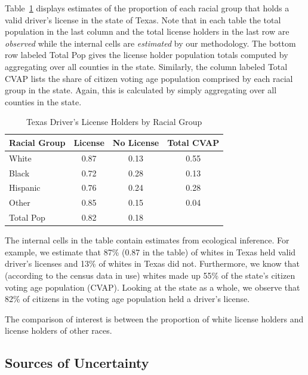 \documentclass[12pt]{article}
\begin{document}
Table~\ref{cvap_f3_ex} displays estimates of the proportion of
each racial group that holds a valid driver's license in the state of Texas. Note that in each
table the total population in the last column and the total license holders in
the last row are {\it observed} while the internal cells are {\it estimated} 
by our methodology. The bottom row labeled Total Pop
gives the license holder population totals computed by aggregating over all counties in the state. 
Similarly, the column labeled Total CVAP lists the
share of citizen voting age population comprised by each racial group
in the state.  Again, this is calculated by simply aggregating over
all counties in the state.

\begin{table}[ht]
\begin{center}
\caption{\label{cvap_f3_ex}Texas Driver's License Holders by Racial Group}
\begin{tabular}{lccc}
  \hline
Racial Group & License & No License & Total CVAP\\
  \hline
White & 0.87 & 0.13 & 0.55 \\ 
Black & 0.72 & 0.28 & 0.13 \\ 
Hispanic & 0.76 & 0.24 & 0.28 \\ 
Other & 0.85 & 0.15 & 0.04 \\ 
Total Pop & 0.82 & 0.18 &   \\ 
   \hline
\end{tabular}
\end{center}
\end{table}

The internal cells in the table contain estimates from ecological
inference. For example, we estimate that 87\% (0.87 in the table) of
whites in Texas held valid driver's licenses and 13\%
of whites in Texas did not.
Furthermore, we know that (according to the census data in use) whites made up 55\% of the state's
citizen voting age population (CVAP).  Looking at the state as a whole, we
observe that 82\% of citizens in the voting age population held a driver's license. 

The comparison of interest is between the proportion of white license holders and license holders of other races.

\subsection{Sources of Uncertainty}
\end{document}
